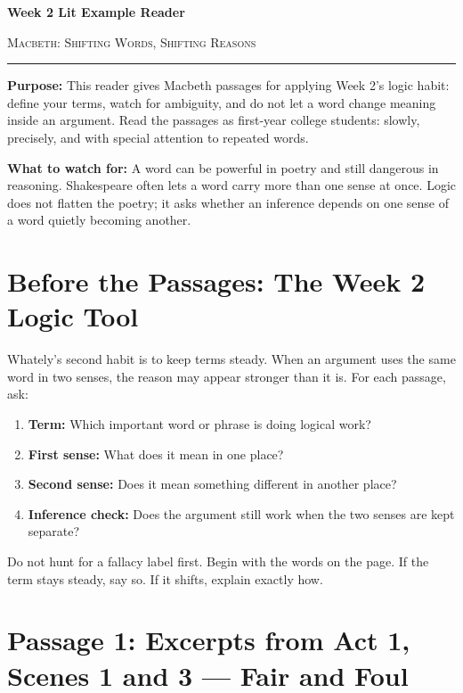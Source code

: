 \documentclass[12pt]{article}
\begin{document}
\begin{center}
{\LARGE\bfseries Week 2 Lit Example Reader}\par\vspace{0.05em}
{\large\scshape Macbeth: Shifting Words, Shifting Reasons}\par\vspace{0.15em}
\rule{0.78\textwidth}{0.5pt}
\end{center}

\textbf{Purpose:} This reader gives Macbeth passages for applying Week 2's logic habit: define your terms, watch for ambiguity, and do not let a word change meaning inside an argument. Read the passages as first-year college students: slowly, precisely, and with special attention to repeated words.

\textbf{What to watch for:} A word can be powerful in poetry and still dangerous in reasoning. Shakespeare often lets a word carry more than one sense at once. Logic does not flatten the poetry; it asks whether an inference depends on one sense of a word quietly becoming another.

\section*{Before the Passages: The Week 2 Logic Tool}

Whately's second habit is to keep terms steady. When an argument uses the same word in two senses, the reason may appear stronger than it is. For each passage, ask:

\begin{enumerate}[leftmargin=1.5em,itemsep=0.2em]
\item \textbf{Term:} Which important word or phrase is doing logical work?
\item \textbf{First sense:} What does it mean in one place?
\item \textbf{Second sense:} Does it mean something different in another place?
\item \textbf{Inference check:} Does the argument still work when the two senses are kept separate?
\end{enumerate}

Do not hunt for a fallacy label first. Begin with the words on the page. If the term stays steady, say so. If it shifts, explain exactly how.

\section*{Passage 1: Excerpts from Act 1, Scenes 1 and 3 --- Fair and Foul}
\end{document}
